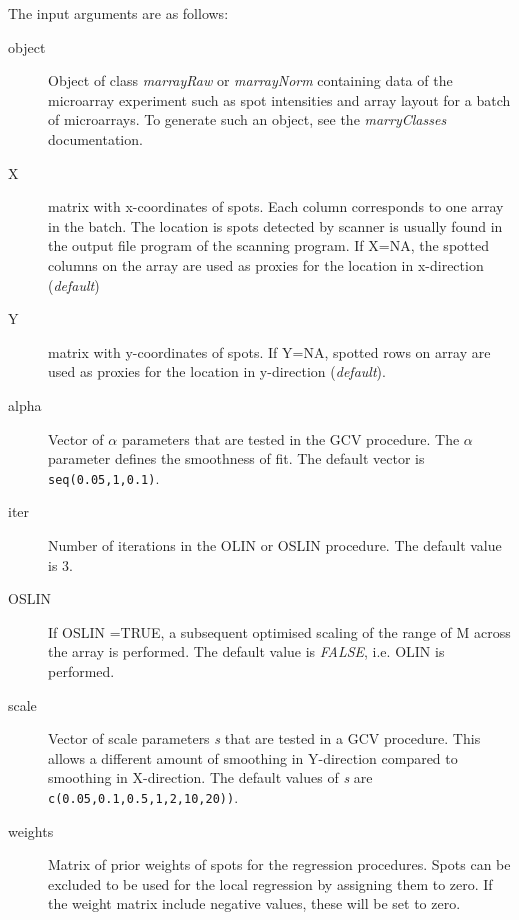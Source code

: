 \documentclass[a4paper,11pt]{article}
\begin{document}
\noindent The input arguments are  as follows:
           \begin{description}
           \item[object] Object of class \emph{marrayRaw} or \emph{marrayNorm} containing 
                         data of the microarray experiment such as spot intensities and array layout
                         for a batch of microarrays.
                         To generate such an object, see the \emph{marryClasses} documentation.
           \item[X]      matrix with x-coordinates of spots. Each column corresponds to one array in the batch. The location is spots detected by scanner
                         is usually 
                         found in the output file program of  the scanning program. 
                          If X=NA, the spotted columns on the  array are used as proxies for the location in x-direction (\emph{default})
           \item[Y] matrix with y-coordinates of spots. If Y=NA, spotted rows on array are used
            as proxies for the location in y-direction (\emph{default}).
           \item[alpha] Vector of $\alpha$  parameters that are tested in the GCV procedure. The $\alpha$  parameter 
                  defines the smoothness of fit.  The default vector is \texttt{seq(0.05,1,0.1)}.
           \item[iter] Number of iterations in the OLIN or OSLIN procedure. The default value is 3. 
           \item[OSLIN] If OSLIN =TRUE, a subsequent optimised scaling of the range of M across the array
                        is performed.
                         The default value is \emph{FALSE}, i.e. OLIN is performed. 
           \item[scale] Vector of scale parameters \emph{s} that are tested in a GCV procedure. 
                    This  allows  a different amount of smoothing in Y-direction compared 
                    to smoothing in X-direction. The default values of \emph{s} are 
                    \texttt{c(0.05,0.1,0.5,1,2,10,20))}.
           \item[weights] Matrix of prior weights of spots for the regression procedures.
                          Spots can be excluded to be used
                          for the local regression by assigning them to zero.  
                          If the weight matrix include negative values, these will be
	                   set to zero.\\

\end{description}
\end{document}
